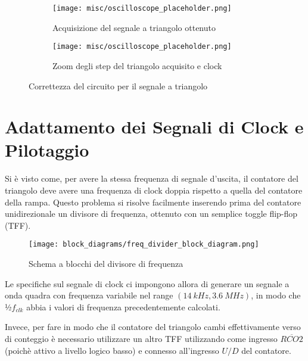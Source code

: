 \begin{figure}[H]
    \centering

    \begin{subfigure}{.5\textwidth}
        \centering
        \texttt{[image: misc/oscilloscope\_placeholder.png]}
        \caption{Acquisizione del segnale a triangolo ottenuto}
        \label{acq_triangle}
    \end{subfigure}%
    \begin{subfigure}{.5\textwidth}
        \centering
        \texttt{[image: misc/oscilloscope\_placeholder.png]}
        \caption{Zoom degli step del triangolo acquisito e clock}
        \label{acq_triangle_steps}
    \end{subfigure}

    \caption{Correttezza del circuito per il segnale a triangolo}
    \label{acq_triangle_signals}
\end{figure}


\section{Adattamento dei Segnali di Clock e Pilotaggio}


Si è visto come, per avere la stessa frequenza di segnale d'uscita, il contatore del
triangolo deve avere una frequenza di clock doppia rispetto a quella del contatore della
rampa. Questo problema si risolve facilmente inserendo prima del contatore unidirezionale
un divisore di frequenza, ottenuto con un semplice toggle flip-flop (TFF).

\begin{figure}[H]
    \centering
    \texttt{[image: block\_diagrams/freq\_divider\_block\_diagram.png]}
    \caption{Schema a blocchi del divisore di frequenza}
    \label{freq_divider_block_diagram}
\end{figure}

Le specifiche sul segnale di clock ci impongono allora di generare un segnale a onda quadra
con frequenza variabile nel range $(14\ kHz,3.6\ MHz)$, in modo che ½$f_{clk}$ abbia
i valori di frequenza precedentemente calcolati.

Invece, per fare in modo che il contatore del triangolo cambi effettivamente verso di conteggio
è necessario utilizzare un altro TFF utilizzando come ingresso $\overline{RCO2}$ (poichè
attivo a livello logico basso) e connesso all'ingresso $U/D$ del contatore.

